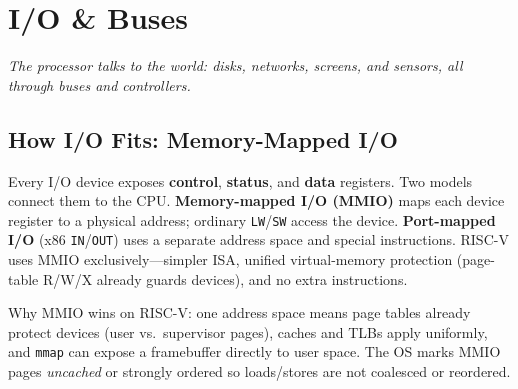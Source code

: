 \chapter{I/O \& Buses}\label{ch:io}
\begin{center}\small\textit{The processor talks to the world: disks, networks, screens, and sensors, all through buses and controllers.}\end{center}

\section{How I/O Fits: Memory-Mapped I/O}
Every I/O device exposes \textbf{control}, \textbf{status}, and \textbf{data} registers. Two models connect them to the CPU. \textbf{Memory-mapped I/O (MMIO)} maps each device register to a physical address; ordinary \texttt{LW}/\texttt{SW} access the device. \textbf{Port-mapped I/O} (x86 \texttt{IN}/\texttt{OUT}) uses a separate address space and special instructions. RISC-V uses MMIO exclusively---simpler ISA, unified virtual-memory protection (page-table R/W/X already guards devices), and no extra instructions.

Why MMIO wins on RISC-V: one address space means page tables already protect devices (user vs.\ supervisor pages), caches and TLBs apply uniformly, and \texttt{mmap} can expose a framebuffer directly to user space. The OS marks MMIO pages \emph{uncached} or strongly ordered so loads/stores are not coalesced or reordered.

\begin{center}
\end{center}


